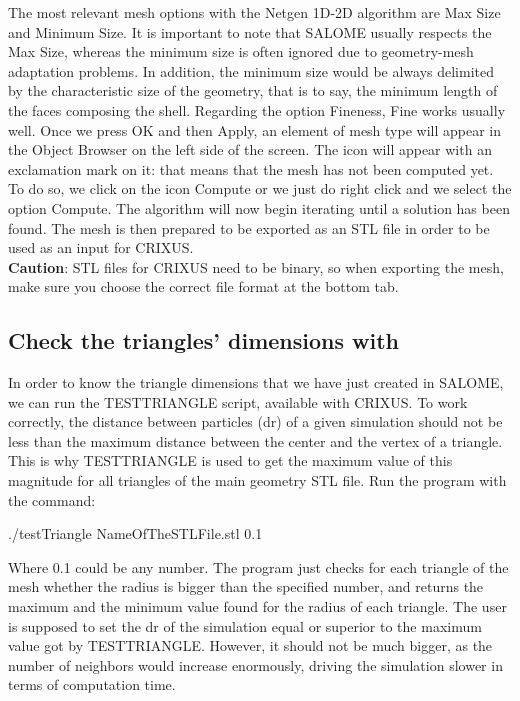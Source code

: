 \documentclass[12pt]{memoir}
\begin{document}
The most relevant mesh options with the Netgen 1D-2D algorithm 
are Max Size and Minimum Size. 
It is important to note that SALOME usually respects the Max Size, 
whereas the minimum size is often ignored due to geometry-mesh 
adaptation problems. In addition, the minimum size would be 
always delimited by the characteristic size of the geometry, 
that is to say, the minimum length of the faces composing the shell. 
Regarding the option Fineness, Fine works usually well. 
Once we press OK and then Apply, an element of mesh type 
will appear in the Object Browser on the left side of the screen. 
The icon will appear with an exclamation mark on it: that means 
that the mesh has not been computed yet. To do so, we click on 
the icon Compute or we just do right click and we select 
the option Compute. The algorithm will now begin iterating 
until a solution has been found. 
The mesh is then prepared to be exported as an STL file 
in order to be used as an input for CRIXUS. \\

\textbf{Caution}: STL files for CRIXUS need to be binary, 
so when exporting the mesh, make sure you choose the correct 
file format at the bottom tab.


\subsection{Check the triangles' dimensions with }
In order to know the triangle dimensions that we have just created in SALOME, 
we can run the TESTTRIANGLE script, available with CRIXUS.
To work correctly, the distance between particles (dr) of a given simulation 
should not be less than the maximum distance between the center and the 
vertex of a triangle. This is why TESTTRIANGLE is used to get the maximum 
value of this magnitude for all triangles of the main geometry STL file. 
Run the program with the command:
\begin{shellcode}
./testTriangle NameOfTheSTLFile.stl 0.1
\end{shellcode}
Where 0.1 could be any number. 
The program just checks for each triangle of the mesh whether the 
radius is bigger than the specified number, and returns the 
maximum and the minimum value found for the radius of each triangle. 
The user is supposed to set the dr of the simulation equal 
or superior to the maximum value got by TESTTRIANGLE. 
However, it should not be much bigger, as the number of neighbors 
would increase enormously, driving the simulation slower in terms of computation time.
\end{document}
